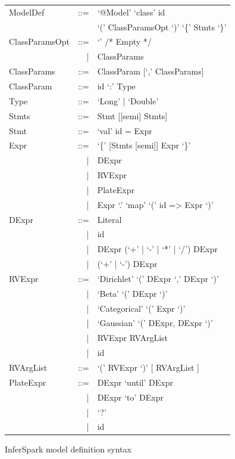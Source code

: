 \begin{figure}[!h]
\centering
\small
	\begin{tabular}{lrl}
		ModelDef		& ::= & `@Model' `class' id \\
					&     &`(' ClassParamsOpt `)' `\{' Stmts `\}' \\
		ClassParamsOpt	& ::= & `' /* Empty */ \\
						&	| &	ClassParams \\
		ClassParams		& ::= & ClassParam  [`,' ClassParams] \\
		ClassParam		& ::= & id `:' Type \\
		Type			& ::= & `Long' | `Double' \\
		Stmts			& ::= & Stmt [[semi] Stmts]\\
		Stmt			& ::= & `val' id = Expr \\
		Expr			& ::= & `\{' [Stmts [semi]] Expr `\}' \\
						&	| & DExpr	\\
						&   | & RVExpr \\
						&	| & PlateExpr \\
						&	| & Expr `.' `map' `(' id => Expr `)'\\
		DExpr			& ::= & Literal	\\
						&   | & id \\
						&   | & DExpr (`+' | `-' | `*' | `/') DExpr \\
						&   | & (`+' | `-') DExpr	\\
		RVExpr			& ::= & `Dirichlet' `(' DExpr `,' DExpr `)' \\
						&   | & `Beta' `(' DExpr `)' \\
						&   | & `Categorical' `(' Expr `)' \\
						&   | & `Gaussian' `(' DExpr, DExpr `)' \\
						&   | & RVExpr RVArgList	\\
						&   | & id	\\
		RVArgList		& ::= & `(' RVExpr `)' [ RVArgList ] \\
		PlateExpr		& ::= & DExpr `until' DExpr	\\ 
						&   | & DExpr `to' DExpr	\\
						&	| & `?' \\
						&	| & id
	\end{tabular}
\caption{InferSpark model definition syntax}
\label{fig:inferspark_syntax}
\end{figure}


